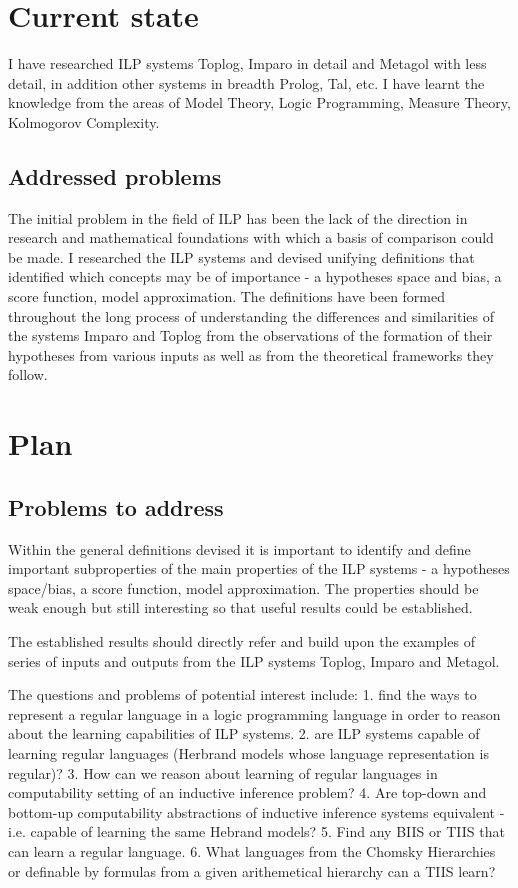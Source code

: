\section{Current state}
I have researched ILP systems Toplog, Imparo in detail and Metagol with less detail, in addition other systems in breadth Prolog, Tal, etc. I have learnt the knowledge from the areas of Model Theory, Logic Programming, Measure Theory, Kolmogorov Complexity.

\subsection{Addressed problems}
The initial problem in the field of ILP has been the lack of the direction in research and mathematical foundations with which a basis of comparison could be made. I researched the ILP systems and devised unifying definitions that identified which concepts may be of importance - a hypotheses space and bias, a score function, model approximation. The definitions have been formed throughout the long process of understanding the differences and similarities of the systems Imparo and Toplog from the observations of the formation of their hypotheses from various inputs as well as from the theoretical frameworks they follow.

\section{Plan}

\subsection{Problems to address}
Within the general definitions devised it is important to identify and define important subproperties of the main properties of the ILP systems - a hypotheses space/bias, a score function, model approximation. The properties should be weak enough but still interesting so that useful results could be established.

The established results should directly refer and build upon the examples of series of inputs and outputs from the ILP systems Toplog, Imparo and Metagol.

The questions and problems of potential interest include:
1. find the ways to represent a regular language in a logic programming language in order to reason about the learning capabilities of ILP systems.
2. are ILP systems capable of learning regular languages (Herbrand models whose language representation is regular)?
3. How can we reason about learning of regular languages in computability setting of an inductive inference problem?
4. Are top-down and bottom-up computability abstractions of inductive inference systems equivalent - i.e. capable of learning the same Hebrand models?
5. Find any BIIS or TIIS that can learn a regular language.
6. What languages from the Chomsky Hierarchies or definable by formulas from a given arithemetical hierarchy can a TIIS learn?

